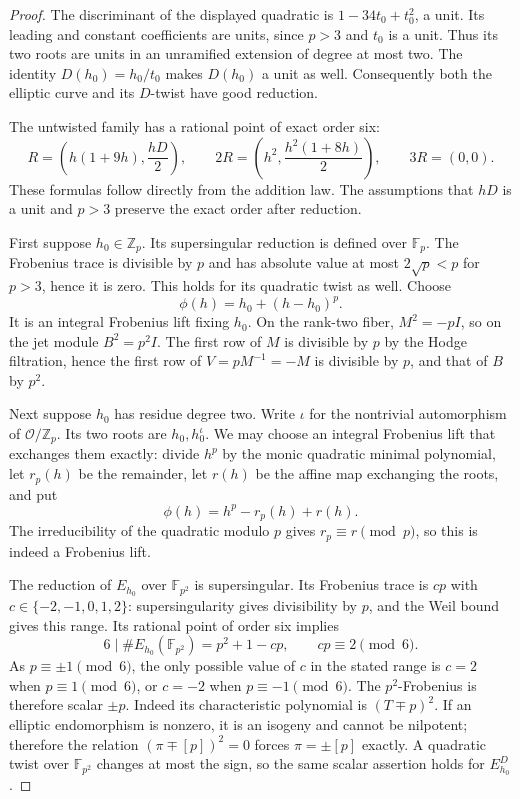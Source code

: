 \documentclass[11pt,letterpaper]{article}
\theoremstyle{definition}
\theoremstyle{remark}
\begin{document}
\begin{proof}
The discriminant of the displayed quadratic is $1-34t_0+t_0^2$, a unit.
Its leading and constant coefficients are units, since $p>3$ and $t_0$
is a unit. Thus its two roots are units in an unramified extension of
degree at most two. The identity $D(h_0)=h_0/t_0$ makes $D(h_0)$ a unit
as well. Consequently both the elliptic curve and its $D$-twist have
good reduction.

The untwisted family has a rational point of exact order six:
\[
 R=\left(h(1+9h),\frac{hD}{2}\right),\qquad
 2R=\left(h^2,\frac{h^2(1+8h)}2\right),\qquad 3R=(0,0).
\]
These formulas follow directly from the addition law. The assumptions
that $hD$ is a unit and $p>3$ preserve the exact order after reduction.

First suppose $h_0\in\mathbb Z_p$. Its supersingular reduction is
defined over $\mathbb F_p$. The Frobenius trace is divisible by $p$ and
has absolute value at most $2\sqrt p<p$ for $p>3$, hence it is zero.
This holds for its quadratic twist as well. Choose
\[
 \phi(h)=h_0+(h-h_0)^p.
\]
It is an integral Frobenius lift fixing $h_0$. On the rank-two fiber,
$M^2=-pI$, so on the jet module $B^2=p^2I$. The first row of $M$ is
divisible by $p$ by the Hodge filtration, hence the first row of
$V=pM^{-1}=-M$ is divisible by $p$, and that of $B$ by $p^2$.

Next suppose $h_0$ has residue degree two. Write $\iota$ for the
nontrivial automorphism of $\mathcal O/\mathbb Z_p$. Its two roots are
$h_0,h_0^\iota$. We may choose an integral Frobenius lift that exchanges
them exactly: divide $h^p$ by the monic quadratic minimal polynomial,
let $r_p(h)$ be the remainder, let $r(h)$ be the affine map exchanging
the roots, and put
\[
 \phi(h)=h^p-r_p(h)+r(h).
\]
The irreducibility of the quadratic modulo $p$ gives
$r_p\equiv r\pmod p$, so this is indeed a Frobenius lift.

The reduction of $E_{h_0}$ over $\mathbb F_{p^2}$ is supersingular.
Its Frobenius trace is $cp$ with
$c\in\{-2,-1,0,1,2\}$: supersingularity gives divisibility by $p$,
and the Weil bound gives this range. Its rational point of order six
implies
\[
 6\mid\#E_{h_0}(\mathbb F_{p^2})=p^2+1-cp,
 \qquad cp\equiv2\pmod6.
\]
As $p\equiv\pm1\pmod6$, the only possible value of $c$ in the stated
range is $c=2$ when $p\equiv1\pmod6$, or $c=-2$ when
$p\equiv-1\pmod6$. The $p^2$-Frobenius is therefore scalar $\pm p$.
Indeed its characteristic polynomial is $(T\mp p)^2$. If an elliptic
endomorphism is nonzero, it is an isogeny and cannot be nilpotent;
therefore the relation $(\pi\mp[p])^2=0$ forces $\pi=\pm[p]$ exactly.
A quadratic twist over $\mathbb F_{p^2}$ changes at most the sign, so
the same scalar assertion holds for $E_{h_0}^D$.


\end{proof}
\end{document}
